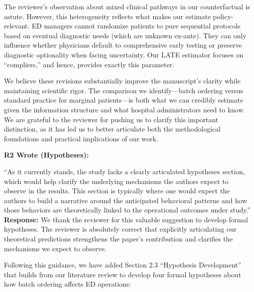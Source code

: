 \documentclass[11pt]{article}
\newenvironment{quote2}
{ \bigskip
\noindent
         \small\em
         \baselineskip=14pt
}
\newcommand{\1}{\hbox{\rm 1\kern-.35em 1}}
\begin{document}
The reviewer's observation about mixed clinical pathways in our counterfactual is astute. However, this heterogeneity reflects what makes our estimate policy-relevant. ED managers cannot randomize patients to pure sequential protocols based on eventual diagnostic needs (which are unknown ex-ante). They can only influence whether physicians default to comprehensive early testing or preserve diagnostic optionality when facing uncertainty. Our LATE estimator focuses on ``compliers,'' and hence,  provides exactly this parameter.

We believe these revisions substantially improve the manuscript's clarity while maintaining scientific rigor. The comparison we identify—batch ordering versus standard practice for marginal patients—is both what we can credibly estimate given the information structure and what hospital administrators need to know. We are grateful to the reviewer for pushing us to clarify this important distinction, as it has led us to better articulate both the methodological foundations and practical implications of our work.

\color{black}

\begin{quote2}
\textbf{R2 Wrote (Hypotheses):}  

\noindent``As it currently stands, the study lacks a clearly articulated hypotheses section, which would help clarify the underlying mechanisms the authors expect to observe in the results. This section is typically where one would expect the authors to build a narrative around the anticipated behavioral patterns and how those behaviors are theoretically linked to the operational outcomes under study.'' 
\end{quote2}

\noindent\textbf{Response:} \color{blue}We thank the reviewer for this valuable suggestion to develop formal hypotheses. The reviewer is absolutely correct that explicitly articulating our theoretical predictions strengthens the paper's contribution and clarifies the mechanisms we expect to observe.

Following this guidance, we have added Section 2.3 ``Hypothesis Development'' that builds from our literature review to develop four formal hypotheses about how batch ordering affects ED operations:
\end{document}
